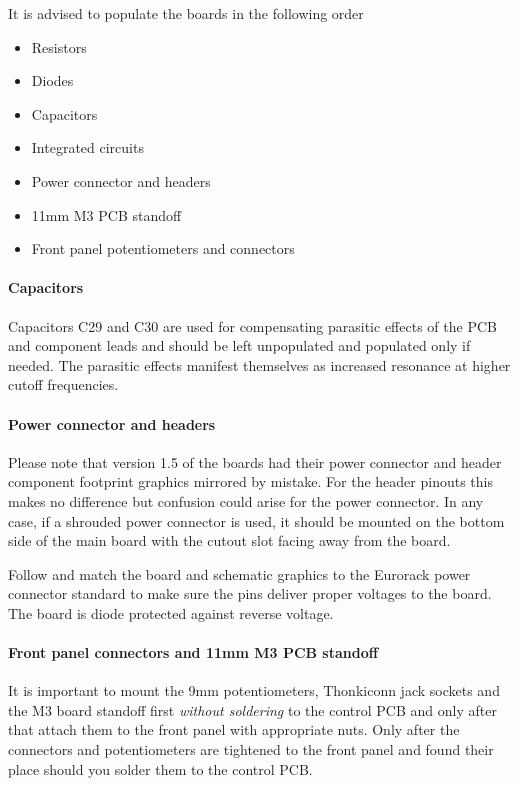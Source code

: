 \documentclass{article}
\begin{document}
\newpage

It is advised to populate the boards in the following order

\begin{itemize}
\item Resistors
\item Diodes
\item Capacitors
\item Integrated circuits
\item Power connector and headers
\item 11mm M3 PCB standoff
\item Front panel potentiometers and connectors
\end{itemize}

\paragraph{Capacitors}
\begin{flushleft}
Capacitors C29 and C30 are used for compensating parasitic effects of the PCB and component leads and should be left unpopulated and populated only if needed. The parasitic effects manifest themselves as increased resonance at higher cutoff frequencies.
\end{flushleft}

\paragraph{Power connector and headers}
\begin{flushleft}
Please note that version 1.5 of the boards had their power connector and header component footprint graphics mirrored by mistake. For the header pinouts this makes no difference but confusion could arise for the power connector. In any case, if a shrouded power connector is used, it should be mounted on the bottom side of the main board with the cutout slot facing away from the board.
\end{flushleft}
\begin{flushleft}
Follow and match the board and schematic graphics to the Eurorack power connector standard to make sure the pins deliver proper voltages to the board. The board is diode protected against reverse voltage.
\end{flushleft}

\paragraph{Front panel connectors and 11mm M3 PCB standoff}
\begin{flushleft}
It is important to mount the 9mm potentiometers, Thonkiconn jack sockets and the M3 board standoff first \emph{without soldering} to the control PCB and only after that attach them to the front panel with appropriate nuts. Only after the connectors and potentiometers are tightened to the front panel and found their place should you solder them to the control PCB.
\end{flushleft}
\end{document}
